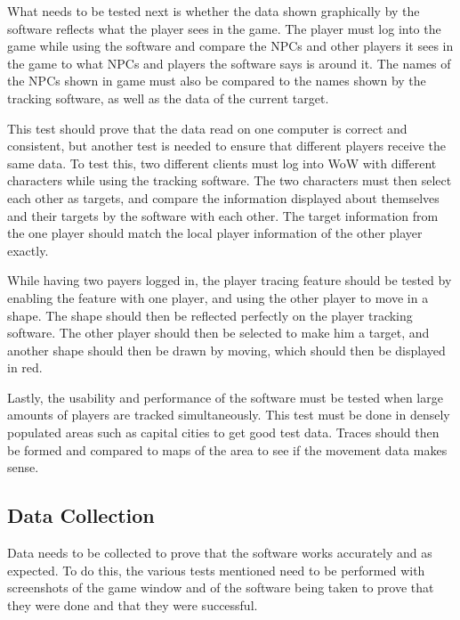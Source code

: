 
What needs to be tested next is whether the data shown graphically by the software reflects what the player sees in the game. The player must log into the game while using the software and compare the NPCs and other players it sees in the game to what NPCs and players the software says is around it. The names of the NPCs shown in game must also be compared to the names shown by the tracking software, as well as the data of the current target.

This test should prove that the data read on one computer is correct and consistent, but another test is needed to ensure that different players receive the same data. To test this, two different clients must log into WoW with different characters while using the tracking software. The two characters must then select each other as targets, and compare the information displayed about themselves and their targets by the software with each other. The target information from the one player should match the local player information of the other player exactly.

While having two payers logged in, the player tracing feature should be tested by enabling the feature with one player, and using the other player to move in a shape. The shape should then be reflected perfectly on the player tracking software. The other player should then be selected to make him a target, and another shape should then be drawn by moving, which should then be displayed in red.

Lastly, the usability and performance of the software must be tested when large amounts of players are tracked simultaneously. This test must be done in densely populated areas such as capital cities to get good test data. Traces should then be formed and compared to maps of the area to see if the movement data makes sense. 


\subsection{Data Collection}
Data needs to be collected to prove that the software works accurately and as expected. To do this, the various tests mentioned need to be performed with screenshots of the game window and of the software being taken to prove that they were done and that they were successful. 

